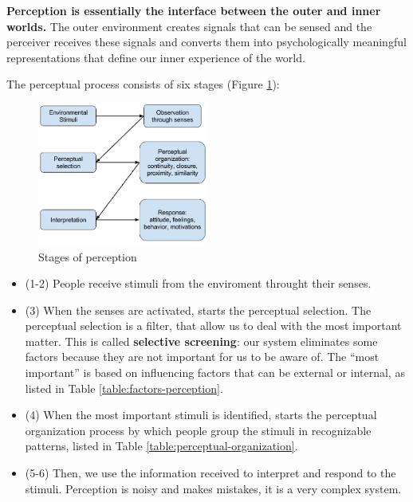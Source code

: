 \documentclass[12pt,article,oneside,a4paper]{memoir}
\begin{document}
\textbf{Perception is essentially the interface between the outer and inner
worlds.} The outer environment creates signals that can be sensed and the
perceiver receives these signals and converts them into psychologically
meaningful representations that define our inner experience of the world.

The perceptual process consists of six stages (Figure \ref{fig:perception-stages}):

\begin{figure}
  \centering
  \includegraphics[width=0.5\textwidth]{imgs/perception-stages.png}
  \caption{Stages of perception}
  \label{fig:perception-stages}
\end{figure}

\begin{itemize}
\item (1-2) People receive stimuli from the enviroment throught their senses.
\item (3) When the senses are activated, starts the perceptual selection. The
perceptual selection is a filter, that allow us to deal with the most important
matter. This is called \textbf{selective screening}: our system eliminates some
factors because they are not important for us to be aware of. The ``most
important'' is based on influencing factors that can be external or internal,
as listed in Table \ref{table:factors-perception}.
\item (4) When the most important stimuli is identified, starts the perceptual
organization process by which people group the stimuli in recognizable patterns,
listed in Table  \ref{table:perceptual-organization}.
\item (5-6) Then, we use the information received to interpret and respond to
the stimuli. Perception is noisy and makes mistakes, it is a very complex system.
\end{itemize}
\end{document}
